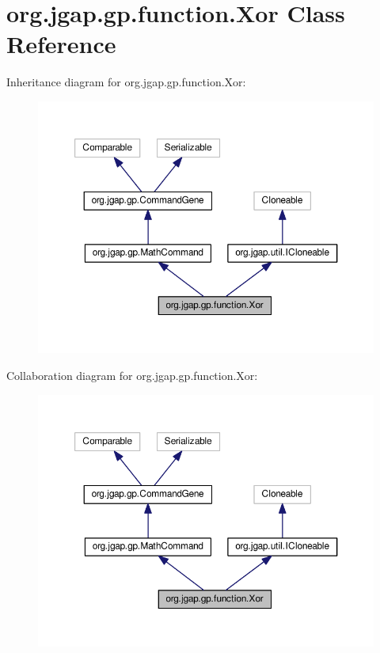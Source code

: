 \hypertarget{classorg_1_1jgap_1_1gp_1_1function_1_1_xor}{\section{org.\-jgap.\-gp.\-function.\-Xor Class Reference}
\label{classorg_1_1jgap_1_1gp_1_1function_1_1_xor}
}


Inheritance diagram for org.\-jgap.\-gp.\-function.\-Xor\-:
\nopagebreak
\begin{figure}[H]
\begin{center}
\leavevmode
\includegraphics[width=350pt]{classorg_1_1jgap_1_1gp_1_1function_1_1_xor__inherit__graph}
\end{center}
\end{figure}


Collaboration diagram for org.\-jgap.\-gp.\-function.\-Xor\-:
\nopagebreak
\begin{figure}[H]
\begin{center}
\leavevmode
\includegraphics[width=350pt]{classorg_1_1jgap_1_1gp_1_1function_1_1_xor__coll__graph}
\end{center}
\end{figure}
